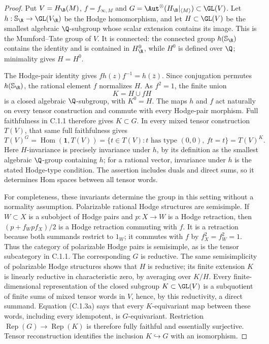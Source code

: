 \begin{proof}
Put $V=H_{\B}(M)$, $f=f_{\infty,M}$ and
$G=\Aut^\otimes(H_{\B}|_{\langle M\rangle})\subset\GL(V)$.
Let $h:\mathbb S_{\R}\to\GL(V_{\R})$ be the Hodge homomorphism,
and let $H\subset\GL(V)$ be the smallest algebraic $\Q$-subgroup
whose scalar extension contains its image. This is the
Mumford--Tate group of $V$. It is connected: the connected group
$h(\mathbb S_{\R})$ contains the identity and is contained in
$H^0_{\R}$, while $H^0$ is defined over $\Q$; minimality gives
$H=H^0$.

The Hodge-pair identity gives
$fh(z)f^{-1}=h(\bar z)$. Since conjugation permutes
$h(\mathbb S_{\R})$, the rational element $f$ normalizes $H$.
As $f^2=1$, the finite union
\[
                         K=H\cup fH
\]
is a closed algebraic $\Q$-subgroup, with $K^0=H$.
The maps $h$ and $f$ act naturally on every tensor construction
and commute with every Hodge-pair morphism. Full faithfulness
in C.1.1 therefore gives $K\subset G$. In every mixed tensor
construction $T(V)$, that same full faithfulness gives
\[
 T(V)^G=\operatorname{Hom}(\mathbf1,T(V))
       =\{t\in T(V):t\text{ has type }(0,0),\ ft=t\}
       =T(V)^K.                                      \tag{C.1.3a}
\]
Here $H$-invariance is precisely invariance under $h$, by its
definition as the smallest algebraic $\Q$-group containing $h$;
for a rational vector, invariance under $h$ is the stated
Hodge-type condition. The assertion includes duals and direct
sums, so it determines Hom spaces between all tensor words.

For completeness, these invariants determine the group in this
setting without a normality assumption. Polarizable rational
Hodge structures are semisimple. If $W\subset X$ is a subobject
of Hodge pairs and $p:X\to W$ is a Hodge retraction, then
$(p+f_Wpf_X)/2$ is a Hodge retraction commuting with $f$.
It is a retraction because both summands restrict to $1_W$;
it commutes with $f$ by $f_X^2=f_W^2=1$. Thus the category of
polarizable Hodge pairs is semisimple, as is the tensor
subcategory in C.1.1. The corresponding $G$ is reductive.
The same semisimplicity of polarizable Hodge structures shows
that $H$ is reductive; its finite extension $K$ is linearly
reductive in characteristic zero, by averaging over $K/H$.
Every finite-dimensional representation of the closed subgroup
$K\subset\GL(V)$ is a subquotient of finite sums of mixed
tensor words in $V$, hence, by this reductivity, a direct
summand. Equation (C.1.3a) says that every $K$-equivariant map
between these words, including every idempotent, is
$G$-equivariant. Restriction $\operatorname{Rep}(G)\to
\operatorname{Rep}(K)$ is therefore fully faithful and
essentially surjective. Tensor reconstruction
\cite[Theorem 2.11]{DM1982} identifies the inclusion $K\hookrightarrow G$
with an isomorphism.


\end{proof}

